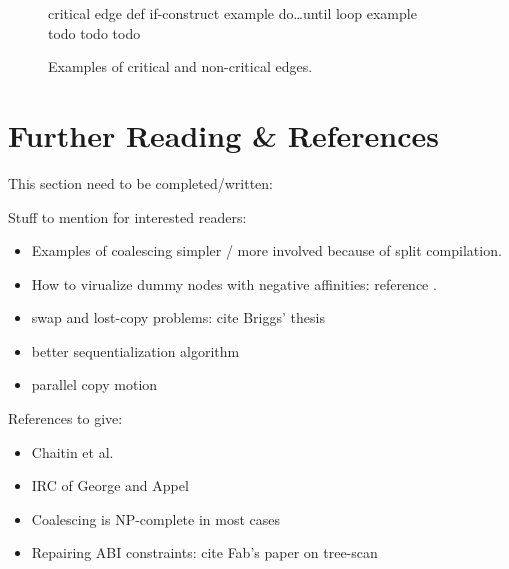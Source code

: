 {\begin{figure}
  critical edge def \hfill if-construct example \hfill do\dots until loop example\\
  todo \hfill todo \hfill todo

  \caption{Examples of critical and non-critical edges.}
  \label{fig:reg-critical}
\end{figure}


\section{Further Reading \& References}
\label{sec:reg-further-reading}

This section need to be completed/written:

Stuff to mention for interested readers:
\begin{itemize}
  \item Examples of coalescing simpler / more involved because of split compilation.
  \item How to virualize dummy nodes with negative affinities: reference \cite{todo}.
  \item swap and lost-copy problems: cite Briggs' thesis
  \item better sequentialization algorithm
  \item parallel copy motion
\end{itemize}

References to give:
\begin{itemize}
  \item Chaitin et al.~\cite{chaitin:1981:register}
  \item IRC of George and Appel~\cite{george:96:iterated}
  \item Coalescing is NP-complete in most cases~\cite{BouchezDR07:coalescing-cplx}
  \item Repairing ABI constraints: cite Fab's paper on tree-scan~\cite{todo}
\end{itemize}

\endofchapter
}

